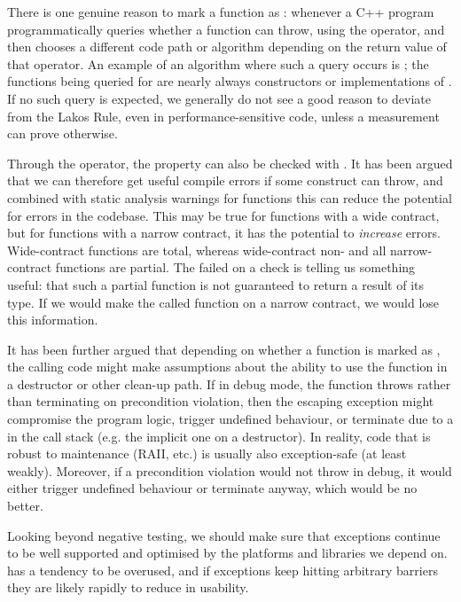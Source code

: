 There is one genuine reason to mark a function as : whenever a C++ program programmatically queries whether a function can throw, using the  operator, and then chooses a different code path or algorithm depending on the return value of that operator. An example of an algorithm where such a query occurs is ; the functions being queried for  are nearly always constructors or implementations of . If no such query is expected, we generally do not see a good reason to deviate from the Lakos Rule, even in performance-sensitive code, unless a measurement can prove otherwise.

Through the  operator, the  property can also be checked with . It has been argued that we can therefore get useful compile errors if some construct can throw, and combined with static analysis warnings for  functions this can reduce the potential for errors in the codebase. This may be true for functions with a wide contract, but for functions with a narrow contract, it has the potential to \emph{increase} errors. Wide-contract  functions are total, whereas wide-contract non- and all narrow-contract functions are partial. The failed  on a  check is telling us something useful: that such a partial function is not guaranteed to return a result of its type. If we would make the called function  on a narrow contract, we would lose this information.

It has been further argued that depending on whether a function is marked as , the calling code might make assumptions about the ability to use the function in a destructor or other clean-up path. If in debug mode, the function throws rather than terminating on precondition violation, then the escaping exception might compromise the program logic, trigger undefined behaviour, or terminate due to a  in the call 
stack (e.g. the implicit one on a destructor). In reality, code that is robust to maintenance (RAII, etc.) is usually also exception-safe (at least weakly). Moreover, if a precondition violation would not throw in debug, it would either trigger undefined behaviour or terminate anyway, which would be no better.

Looking beyond negative testing, we should make sure that exceptions continue to be well supported and optimised by the platforms and libraries we depend on.   has a tendency to be overused, and if exceptions keep hitting arbitrary  barriers they are likely rapidly to reduce in usability.

